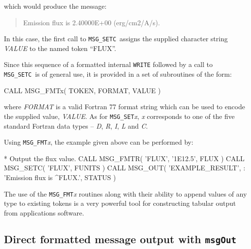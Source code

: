 \documentclass[twoside,11pt]{starlink}
\providecommand{\func}[1]{\texttt{#1}}
\providecommand{\farg}[1]{\textit{#1}}
\providecommand{\msgout}{\func{msgOut}}
\providecommand{\fmsgsetc}{\func{MSG\_SETC}}
\begin{document}
which would produce the message:

\begin {quote}
\begin {small}
\begin{terminalv}
Emission flux is  2.40000E+00 (erg/cm2/A/s).
\end{terminalv}
\end {small}
\end {quote}

In this case, the first call to \fmsgsetc\ assigns the supplied character
string \farg{VALUE} to the named token ``FLUX''.

Since this sequence of a formatted internal \func{WRITE} followed by a call to
\fmsgsetc\ is of general use, it is provided in a set of subroutines of the
form:

\begin {small}
\begin{terminalv}
      CALL MSG_FMTx( TOKEN, FORMAT, VALUE )
\end{terminalv}
\end {small}

where \farg{FORMAT} is a valid Fortran 77 format string which can be used to
encode the supplied value, \farg{VALUE}.
As for \func{MSG\_SET}\textit{x}, \textit{x} corresponds to one of the five standard
Fortran data types -- \textit{D}, \textit{R}, \textit{I}, \textit{L} and \textit{C}.

Using \func{MSG\_FMT}\textit{x}, the example given above can be performed by:

\begin {small}
\begin{terminalv}
*  Output the flux value.
      CALL MSG_FMTR( 'FLUX', '1E12.5', FLUX )
      CALL MSG_SETC( 'FLUX', FUNITS )
      CALL MSG_OUT( 'EXAMPLE_RESULT',
     :             'Emission flux is ^FLUX.', STATUS )
\end{terminalv}
\end {small}

The use of the \func{MSG\_FMT}\textit{x} routines along with their ability to append
values of any type to existing tokens is a very powerful tool for constructing
tabular output from applications software.

\subsection{Direct formatted message
output with \msgout}
\end{document}
